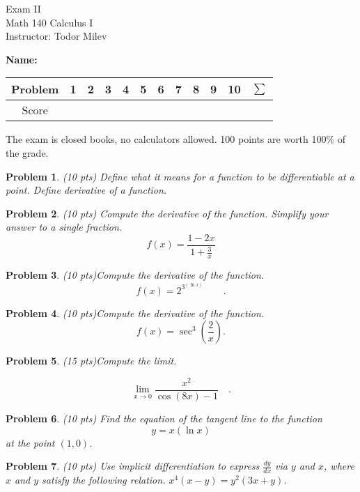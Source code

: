 \documentclass{article}
\newtheorem{problem}{Problem}
\begin{document}
\begin{center}
\Large
Exam II\\ Math 140 Calculus I \\ \normalsize Instructor: Todor Milev
\end{center}

\noindent \textbf{Name:} \hfill{~}
\begin{tabular}{c|c|c|c|c|c|c|c|c|c|c||c}
Problem&1 &2&3&4&5&6&7&8&9&10& $\sum$\\\hline
Score&&&&&&&&&&&
\end{tabular} 

\noindent The exam is closed books, no calculators allowed. 100 points are worth 100\% of the grade. 
\begin{problem}(10 pts)  Define what it means for a function to be differentiable at a point. Define derivative of a function.
\end{problem}

\vskip 8cm

\begin{problem}(10 pts)
Compute the derivative of the function. Simplify your answer to a single fraction.
\[f(x)=\frac{1-2x }{1+\frac{3}x}
\]
\end{problem}
\newpage
\begin{problem}(10 pts)Compute the derivative of the function.
\[
f(x)=2^{3^{(\ln x)}}\quad \quad.
\]
\end{problem}
\vskip 9cm

\begin{problem}(10 pts)Compute the derivative of the function.
\[f(x)= \sec^3 \left(\frac{2}{x}\right).
\]
\end{problem}

\newpage

\begin{problem}(15 pts)Compute the limit.

\[\lim\limits_{x\to 0} 
\frac{x^2}{\cos(8x) -1} \quad .
\] 

\end{problem}
\vskip 9cm


\begin{problem}(10 pts)
Find the equation of the tangent line to the function 
\[
y=x(\ln x) 
\] 
at the point $(1, 0)$. 
\end{problem}

\newpage

\begin{problem}(10 pts)
Use implicit differentiation to express $\frac{dy}{dx}$ via $y $ and $x$, where $x$ and $y$ satisfy the following relation.
$x^4(x-y)=y^2(3x+y)$.
\end{problem}
\vskip 9cm
\end{document}
